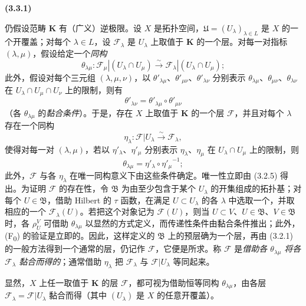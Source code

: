 \documentclass[UTF8,fontset=none,11pt,oneside,openany]{ctexbook}
\newenvironment{env}[1][]{%
  \par\medskip\noindent\textbf{(#1)}\ %
}{\par}
\let\EGAOriginalLabel\label
\renewcommand{\label}[1]{\phantomsection\EGAOriginalLabel{#1}}
\begin{document}
\begin{env}[3.3.1]
\label{0.3.3.1-fr}
仍假设范畴 $\mathbf{K}$ 有（广义）逆极限。设 $X$ 是拓扑空间，$\mathfrak{U}=(U_\lambda)_{\lambda\in L}$ 是 $X$ 的一个开覆盖；对每个 $\lambda\in L$，设 $\mathcal{F}_\lambda$ 是 $U_\lambda$ 上取值于 $\mathbf{K}$ 的一个层。对每一对指标 $(\lambda,\mu)$，假设给定一个\emph{同构}
\[
  \theta_{\lambda\mu}:
  \mathcal{F}_\mu|(U_\lambda\cap U_\mu)
  \xrightarrow{\sim}
  \mathcal{F}_\lambda|(U_\lambda\cap U_\mu);
\]
此外，假设对每个三元组 $(\lambda,\mu,\nu)$，以 $\theta'_{\lambda\mu}$、$\theta'_{\mu\nu}$、$\theta'_{\lambda\nu}$ 分别表示 $\theta_{\lambda\mu}$、$\theta_{\mu\nu}$、$\theta_{\lambda\nu}$ 在 $U_\lambda\cap U_\mu\cap U_\nu$ 上的限制，则有
\[
  \theta'_{\lambda\nu}
  =\theta'_{\lambda\mu}\circ\theta'_{\mu\nu}
\]
（各 $\theta_{\lambda\mu}$ 的\emph{黏合条件}）。于是，存在 $X$ 上取值于 $\mathbf{K}$ 的一个层 $\mathcal{F}$，并且对每个 $\lambda$ 存在一个同构
\[
  \eta_\lambda:\mathcal{F}|U_\lambda\xrightarrow{\sim}\mathcal{F}_\lambda,
\]
使得对每一对 $(\lambda,\mu)$，若以 $\eta'_\lambda$、$\eta'_\mu$ 分别表示 $\eta_\lambda$、$\eta_\mu$ 在 $U_\lambda\cap U_\mu$ 上的限制，则
\[
  \theta_{\lambda\mu}=\eta'_\lambda\circ{\eta'_\mu}^{-1};
\]
此外，$\mathcal{F}$ 与各 $\eta_\lambda$ 在唯一同构意义下由这些条件确定。唯一性立即由 (3.2.5) 得出。为证明 $\mathcal{F}$ 的存在性，令 $\mathfrak{B}$ 为由至少包含于某个 $U_\lambda$ 的开集组成的拓扑基；对每个 $U\in\mathfrak{B}$，借助 Hilbert 的 $\tau$ 函数，在满足 $U\subset U_\lambda$ 的各 $\lambda$ 中选取一个，并取相应的一个 $\mathcal{F}_\lambda(U)$。若把这个对象记为 $\mathcal{F}(U)$，则当 $U\subset V$、$U\in\mathfrak{B}$、$V\in\mathfrak{B}$ 时，各 $\rho_U^V$ 可借助 $\theta_{\lambda\mu}$ 以显然的方式定义，而传递性条件由黏合条件推出；此外，(F\textsubscript{0}) 的验证是立即的。因此，这样定义的 $\mathfrak{B}$ 上的预层确为一个层，再由 (3.2.1) 的一般方法得到一个通常的层，仍记作 $\mathcal{F}$，它便是所求。称 $\mathcal{F}$ 是\emph{借助各 $\theta_{\lambda\mu}$ 将各 $\mathcal{F}_\lambda$ 黏合而得的}；通常借助 $\eta_\lambda$ 把 $\mathcal{F}_\lambda$ 与 $\mathcal{F}|U_\lambda$ 等同起来。

显然，$X$ 上任一取值于 $\mathbf{K}$ 的层 $\mathcal{F}$，都可视为借助恒等同构 $\theta_{\lambda\mu}$，由各层 $\mathcal{F}_\lambda=\mathcal{F}|U_\lambda$ 黏合而得（其中 $(U_\lambda)$ 是 $X$ 的任意开覆盖）。
\end{env}
\end{document}
